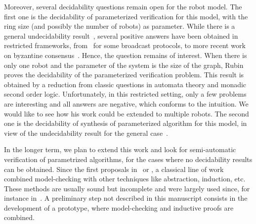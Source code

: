 Moreover, several decidability questions remain open for the robot model. The first one is the decidability of parameterized verification for this model, with the ring size (and possibly the number of robots) as parameter. While there is a general undecidability result~\cite{apt.kozen.86}, 
several positive answers have been obtained in restricted frameworks, from~\cite{EsparzaFM99} for some broadcast protocols, to more recent work on byzantine consensus~\cite{AminofKRSV14,KonnovVW15}. Hence, the question remains of interest.
When there is only one robot and the parameter of the system is the size of the graph, Rubin~\cite{Rubin15} proves the decidability 
of the parameterized verification problem. This result is obtained by a reduction from classic questions in automata theory and monadic second order logic. Unfortunately, in this restricted setting, only a few problems are interesting and all answers are negative, which conforms to the intuition.
We would like to see how his work could be extended to multiple robots.
The second one is the decidability of synthesis of parameterized algorithm for this model, in view of the undecidability result for the general case~\cite{PnueliR90}.


In the longer term, we plan to extend this work and look for semi-automatic verification of parametrized algorithms, for the cases where 
no decidability results can be obtained.  
Since the first proposals in~\cite{MannaP-tacs94} or \cite{ClarkeGJ-concur95}, a classical line of work combined model-checking with other techniques like abstraction, induction, etc.  These methods are usually sound but incomplete and were largely used since, for instance in~\cite{BjornerBCCKMSU96,AlfaroM-tacas97,CansellMM-jucs01,AronsPRXZ-cav01}.
A preliminary step not described in this manuscript consists in the development of a prototype, where model-checking and inductive proofs are combined. 
   



